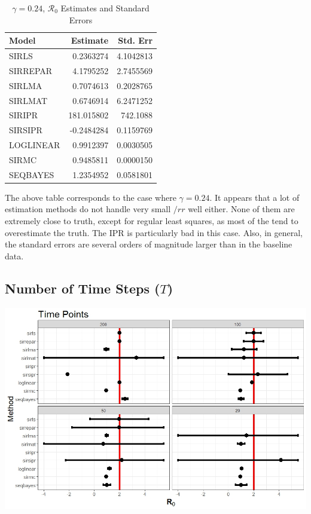 \documentclass[12pt]{article}
\newcommand{\rr}{\ensuremath{\mathcal{R}_0}}
\begin{document}
\begin{table}[H]
	
	\caption{\label{tab:}$\gamma = 0.24$, $\rr$ Estimates and Standard Errors}
	\centering
	\begin{tabular}[t]{l|r|r}
		\hline
		Model & Estimate & Std. Err\\
		\hline
		SIRLS & 0.2363274 & 4.1042813\\
		\hline
		SIRREPAR & 4.1795252 & 2.7455569\\
		\hline
		SIRLMA &  0.7074613 & 0.2028765 \\
		\hline
		SIRLMAT & 0.6746914 & 6.2471252 \\
		\hline
		SIRIPR & 181.015802 & 742.1088 \\
		\hline
		SIRSIPR & -0.2484284 & 0.1159769 \\
		\hline
		LOGLINEAR & 0.9912397 & 0.0030505\\
		\hline
		SIRMC & 0.9485811 & 0.0000150\\
		\hline
		SEQBAYES & 1.2354952 & 0.0581801\\
		\hline
	\end{tabular}
\end{table}

The above table corresponds to the case where $\gamma = 0.24$. It appears that a lot of estimation methods do not handle very small $/rr$ well either. None of them are extremely close to truth, except for regular least squares, as most of the tend to overestimate the truth. The IPR is particularly bad in this case. Also, in general, the standard errors are several orders of magnitude larger than in the baseline data.


\subsection{Number of Time Steps ($T$)}\label{sec:res-time}

\includegraphics[scale=0.5]{time.jpeg}
\end{document}
